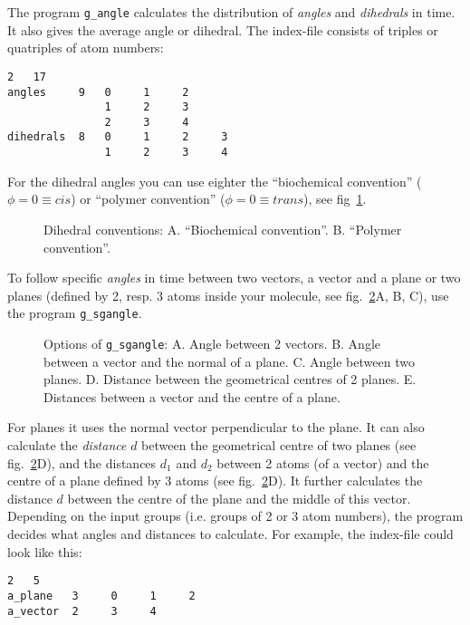 The program {\tt g\_angle} calculates the distribution of {\em angles} and 
{\em dihedrals} in time. It also gives the average angle or dihedral. 
The index-file consists of triples or quatriples of atom numbers:
\begin{verbatim}
2   17
angles     9   0     1     2
               1     2     3
               2     3     4
dihedrals  8   0     1     2     3
               1     2     3     4
\end{verbatim}
For the dihedral angles you can use eighter the ``biochemical convention'' 
($\phi = 0 \equiv cis$) or ``polymer convention'' ($\phi = 0 \equiv trans$), 
see fig~\ref{fig:dih_def}.
%
\begin{figure}[hbtp]
\centerline{
{}}
\caption{Dihedral conventions: A. ``Biochemical convention''. B. ``Polymer convention''.}
\label{fig:dih_def}
\end{figure}
%

To follow specific {\em angles} in time between two vectors, a vector and 
a plane or 
two planes (defined by 2, resp. 3 atoms inside your molecule, see 
fig.~\ref{fig:sgangle}A, B, C), use the program {\tt g\_sgangle}. 
%
\begin{figure}[hbtp]
\centerline{
{}}
\caption[Options of {\tt g\_sgangle}.]{Options of {\tt g\_sgangle}: A. Angle between 2 vectors. B. Angle between a vector and the normal of a plane. C. Angle between two planes. D. Distance between the geometrical centres of 2 planes. E. Distances between a vector and the centre of a plane.}
\label{fig:sgangle}
\end{figure}
%
For planes it uses the normal vector perpendicular to the plane. 
It can also calculate the {\em distance} $d$ between the geometrical centre 
of two planes (see fig.~\ref{fig:sgangle}D), and the distances 
$d_1$ and $d_2$ between 2 atoms (of a vector) and the centre of a plane 
defined by 3 atoms (see fig.~\ref{fig:sgangle}D). It further calculates the 
distance $d$ between the centre of the plane and the middle of this vector. 
Depending on the input groups (i.e. groups of 2 or 3 atom numbers), the 
program decides what angles and distances to calculate. For example, the index-file could look like this:
\begin{verbatim}
2   5
a_plane   3     0     1     2
a_vector  2     3     4
\end{verbatim}
%
%
